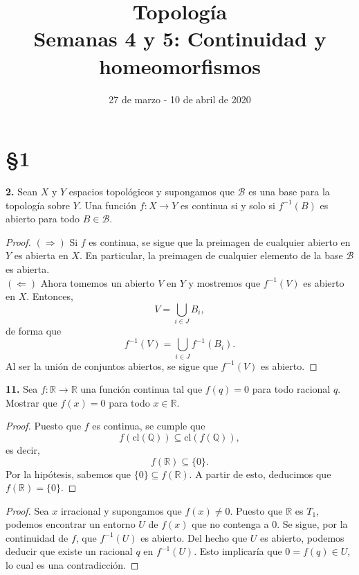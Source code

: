 \documentclass{article}
\begin{document}
\date{27 de marzo - 10 de abril de 2020}
\title{ \textbf{Topología} \\
Semanas 4 y 5: Continuidad y homeomorfismos}
\maketitle	

\section*{§1}

\begin{mybox}
	\textbf{2. } Sean $X$ y $Y$ espacios topológicos y supongamos que $\mathcal{B}$ es una base para la topología sobre $Y$. Una función $f: X \rightarrow Y$ es continua si y solo si $f^{-1}(B)$ es abierto para todo $B \in \mathcal{B}$.
\end{mybox}	
\begin{proof}
	$(\Rightarrow)$ Si $f$ es continua, se sigue que la preimagen de cualquier abierto en $Y$ es abierta en $X$. En particular, la preimagen de cualquier elemento de la base $\mathcal{B}$ es abierta.\\
	$(\Leftarrow)$ Ahora tomemos un abierto $V$ en $Y$ y mostremos que $f^{-1}(V)$ es abierto en $X$. Entonces,
	$$ V = \bigcup_{i \in J} B_{i} ,$$
	de forma que 
	$$ f^{-1}(V) = \bigcup_{i \in J} f^{-1}(B_{i}) .$$
	Al ser la unión de conjuntos abiertos, se sigue que $f^{-1}(V)$ es abierto. 
\end{proof}

\begin{mybox}
	\textbf{11. } Sea $f: \mathbb{R} \rightarrow \mathbb{R}$ una función continua tal que $f(q) = 0$ para todo racional $q$. Mostrar que $f(x) = 0$ para todo $x \in \mathbb{R}$.  	
\end{mybox}	

\begin{proof}
	Puesto que $f$ es continua, se cumple que 
	$$ f(\text{cl}(\mathbb{Q})) \subseteq \text{cl}(f(\mathbb{Q})), $$
	es decir,
	$$ f(\mathbb{R}) \subseteq \{ 0 \}. $$
	Por la hipótesis, sabemos que $\{0 \} \subseteq f(\mathbb{R})$. A partir de esto, deducimos que $f(\mathbb{R}) = \{ 0 \}$.
\end{proof}

\begin{proof}
	Sea $x$ irracional y supongamos que $f(x) \neq 0$. Puesto que $\mathbb{R}$ es $T_{1}$, podemos encontrar un entorno $U$ de $f(x)$ que no contenga a $0$. Se sigue, por la continuidad de $f$, que $f^{-1}(U)$ es abierto. Del hecho que $U$ es abierto, podemos deducir que existe un racional $q$ en $f^{-1}(U)$. Esto implicaría que $0 = f(q) \in U$, lo cual es una contradicción. 
\end{proof}
\end{document}
